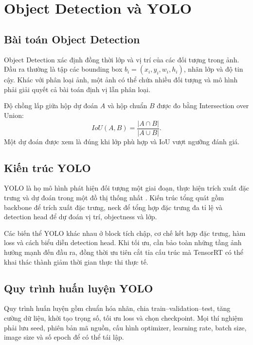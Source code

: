 \section{Object Detection và YOLO}

\subsection{Bài toán Object Detection}

Object Detection xác định đồng thời lớp và vị trí của các đối tượng trong ảnh.
Đầu ra thường là tập các bounding box $b_i=(x_i,y_i,w_i,h_i)$, nhãn lớp và độ
tin cậy. Khác với phân loại ảnh, một ảnh có thể chứa nhiều đối tượng và mô hình
phải giải quyết cả bài toán định vị lẫn phân loại.

Độ chồng lấp giữa hộp dự đoán $A$ và hộp chuẩn $B$ được đo bằng Intersection
over Union:
\begin{equation}
  IoU(A,B)=\frac{|A\cap B|}{|A\cup B|}.
\end{equation}
Một dự đoán được xem là đúng khi lớp phù hợp và IoU vượt ngưỡng đánh giá.

\subsection{Kiến trúc YOLO}

YOLO là họ mô hình phát hiện đối tượng một giai đoạn, thực hiện trích xuất đặc
trưng và dự đoán trong một đồ thị thống nhất \cite{redmon2016,redmon2017}.
Kiến trúc tổng quát gồm backbone để trích xuất đặc trưng, neck để tổng hợp đặc
trưng đa tỉ lệ và detection head để dự đoán vị trí, objectness và lớp.

Các biến thể YOLO khác nhau ở block tích chập, cơ chế kết hợp đặc trưng, hàm
loss và cách biểu diễn detection head. Khi tối ưu, cần bảo toàn những tầng ảnh
hưởng mạnh đến đầu ra, đồng thời ưu tiên cắt tỉa cấu trúc mà TensorRT có thể khai
thác thành giảm thời gian thực thi thực tế.

\subsection{Quy trình huấn luyện YOLO}

Quy trình huấn luyện gồm chuẩn hóa nhãn, chia train--validation--test, tăng cường
dữ liệu, khởi tạo trọng số, tối ưu loss và chọn checkpoint. Mọi thí nghiệm phải
lưu seed, phiên bản mã nguồn, cấu hình optimizer, learning rate, batch size, image
size và số epoch để có thể tái lập.

